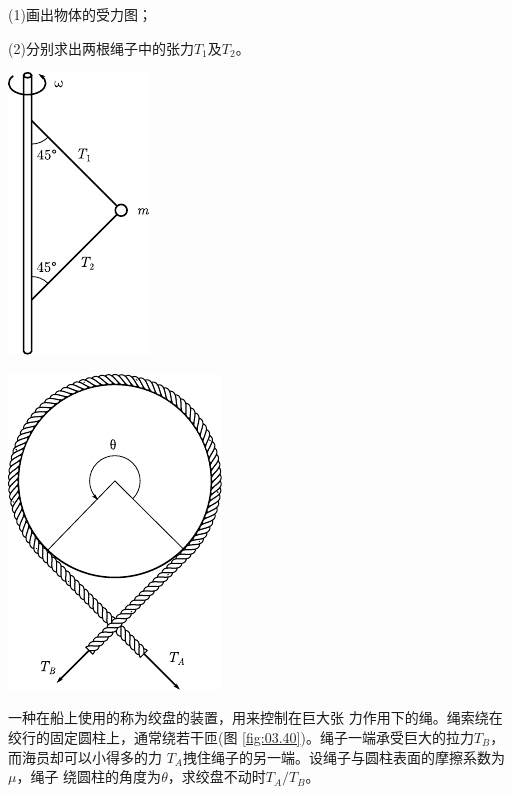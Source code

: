 \begin{exercises}
(1)画出物体的受力图；

(2)分别求出两根绳子中的张力$ T_1 $及$ T_2 $。
\begin{figurex}
	\begin{minipage}[b]{0.5\linewidth}
		\centering
		\includegraphics{figure/fig03.39}
		\caption{}
		\label{fig:03.39}
	\end{minipage}
	\begin{minipage}[b]{0.5\linewidth}
		\centering
		\includegraphics{figure/fig03.40}
		\caption{}
		\label{fig:03.40}
	\end{minipage}
	\vspace{-1.56em}
\end{figurex}

\exercise 一种在船上使用的称为绞盘的装置，用来控制在巨大张
力作用下的绳。绳索绕在绞行的固定圆柱上，通常绕若干匝(图
\ref{fig:03.40})。绳子一端承受巨大的拉力$  T _ { B }  $，而海员却可以小得多的力
$ T_A $拽住绳子的另一端。设绳子与圆柱表面的摩擦系数为$ \mu $，绳子
绕圆柱的角度为$ \theta $，求绞盘不动时$ T_A / T_B $。


\end{exercises}
